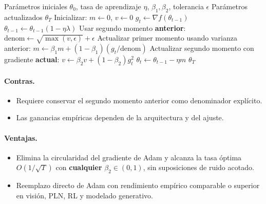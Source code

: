 \begin{algorithm}[H]
\caption{ADOPT (Adam con Ajuste Óptimo Podado)}
\label{alg:adopt}
\begin{algorithmic}[1]
\Require Parámetros iniciales $\theta_0$, tasa de aprendizaje $\eta$, $\beta_1, \beta_2$, tolerancia $\epsilon$
\Ensure Parámetros actualizados $\theta_T$
\State Inicializar: $m \gets 0$, $v \gets 0$
    \State $g_t \gets \nabla f(\theta_{t-1})$
        \State $\theta_{t-1} \gets \theta_{t-1}(1 - \eta\lambda)$
    \EndIf
    \State Usar segundo momento \textbf{anterior}: $\text{denom} \gets \sqrt{\max(v, \epsilon)} + \epsilon$
    \State Actualizar primer momento usando varianza anterior: $m \gets \beta_1 m + (1-\beta_1)(g_t / \text{denom})$
    \State Actualizar segundo momento con gradiente \textbf{actual}: $v \gets \beta_2 v + (1-\beta_2) g_t^2$
    \State $\theta_t \gets \theta_{t-1} - \eta m$
\EndFor
\Return $\theta_T$
\end{algorithmic}
\end{algorithm}

\paragraph{Contras.}
\begin{itemize}[leftmargin=*]
\item Requiere conservar el segundo momento anterior como denominador explícito.
\item Las ganancias empíricas dependen de la arquitectura y del ajuste.
\end{itemize}

\paragraph{Ventajas.}
\begin{itemize}[leftmargin=*]
\item Elimina la circularidad del gradiente de Adam y alcanza la tasa óptima $O(1/\sqrt{T})$ con \textbf{cualquier} $\beta_2 \in (0,1)$, sin suposiciones de ruido acotado.
\item Reemplazo directo de Adam con rendimiento empírico comparable o superior en visión, PLN, RL y modelado generativo.
\end{itemize}

